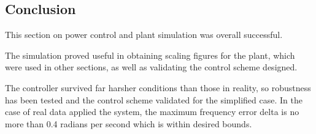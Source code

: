 \subsection{Conclusion}

This section on power control and plant simulation was overall successful.

The simulation proved useful in obtaining scaling figures for the plant, which were used in other sections, as well as validating the control scheme designed.

The controller survived far harsher conditions than those in reality, so robustness has been tested and the control scheme validated for the simplified case.
In the case of real data applied the system, the maximum frequency error delta is no more than 0.4 radians per second which is within desired bounds.

